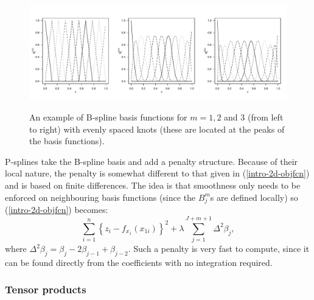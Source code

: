 \begin{figure}[tb]
\centering
\includegraphics[width=6in]{intro/figs/bspline-ex.pdf}\\
\caption{An example of B-spline basis functions for $m=1, 2$ and $3$ (from left to right) with evenly spaced knots (these are located at the peaks of the basis functions).}
\label{bs-basis}
\end{figure}

P-splines take the B-spline basis and add a penalty structure. Because of their local nature, the penalty is somewhat different to that given in (\ref{intro-2d-objfcn}) and is based on finite differences. The idea is that smoothness only needs to be enforced on neighbouring basis functions (since the $B^m_j$s are defined locally) so (\ref{intro-2d-objfcn}) becomes:
\begin{equation*}
\sum_{i=1}^n \left \{ z_i - f_{x_1}(x_{1i}) \right \}^2 +  \lambda \sum_{j=1}^{J+m+1} \Delta^2 \beta_j,
\end{equation*}
where $\Delta^2 \beta_j = \beta_j -2\beta_{j-1} + \beta_{j-2}$. Such a penalty is very fast to compute, since it can be found directly from the coefficients with no integration required.

\subsubsection{Tensor products}
\label{GAMtensor}

